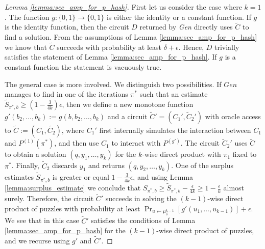 \begin{proof}[Lemma \ref{lemma:sec_amp_for_p_hash}]
First let us consider the case where $k=1$. The function $g: \{0,1\} \rightarrow \{0,1\}$ is either the identity or a constant function.
If $g$ is the identity function, then the circuit $D$ returned by \textit{Gen} directly uses $\widetilde{C}$ to find a solution.
From the assumptions of Lemma \ref{lemma:sec_amp_for_p_hash} we know that $\widetilde{C}$ succeeds with probability at least
$\delta + \epsilon$. Hence, $D$ trivially satisfies the statement of Lemma \ref{lemma:sec_amp_for_p_hash}.
If $g$ is a constant function the statement is vacuously true.

The general case is more involved. We distinguish two possibilities.
If $Gen$ manages to find in one of the iterations $\pi^*$ such that an estimate
$\widetilde{S}_{\pi^*,b} \geq (1-\frac{3}{4k})\epsilon$, then we define a new monotone function
$g'(b_2, \dots, b_k) := g(b, b_2, \dots, b_k)$ and a circuit $\widetilde{C}' = (C_1', \widetilde{C}_2')$ with oracle access to $\widetilde{C} := (C_1, \widetilde{C_2})$,
where $C_1'$ first internally simulates the interaction between $C_1$ and $P^{(1)}(\pi^*)$, and then use $C_1$ to interact with $P^{(g')}$.
The circuit $\widetilde{C}_2'$ uses $\widetilde{C}$ to obtain a solution $(q, y_1, \dots, y_k)$ for the $k$-wise direct product with $\pi_1$ fixed to $\pi^*$.
Finally, $\widetilde{C}_2$ discards $y_1$ and returns $(q, y_2, \dots, y_k)$.
One of the surplus estimates $\widetilde{S}_{\pi^*, b}$ is greater or equal $1 - \frac{3}{4k}\epsilon$, and using Lemma \ref{lemma:surplus_estimate}
we conclude that $S_{\pi^*,b} \geq \widetilde{S}_{\pi^*, b} - \frac{\epsilon}{4k} \geq 1 - \frac{\epsilon}{k}$ almost surely.
Therefore, the circuit $\widetilde{C}'$ succeeds in solving the $(k-1)$-wise direct product of puzzles with probability
at least $\Pr_{u \leftarrow \mu^{k-1}_{\delta}}[g'(u_1,\dots, u_{k-1} )] + \epsilon$.
We see that in this case $\widetilde{C}'$ satisfies the conditions of Lemma \ref{lemma:sec_amp_for_p_hash}
for the $(k-1)$-wise direct product of puzzles, and we recurse using $g'$ and $\widetilde{C}'$.


\end{proof}
